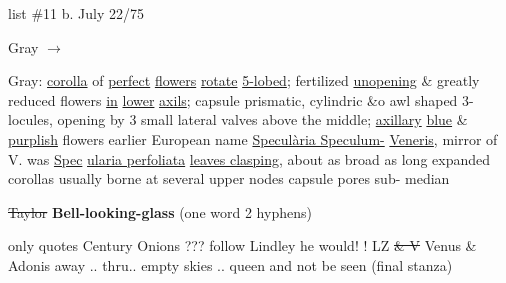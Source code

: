 \documentclass[a4paper]{article}
\begin{document}
\begin{minipage}{0.1\textwidth}
\Circled{\color{blue}{13}} 
\end{minipage}
\begin{minipage}{0.2\textwidth}
\color{blue}
\null list \#11
b. July 22/75
\end{minipage}
\begin{minipage}{0.7\textwidth}
\begin{flushright}
\color{blue}
\par
Gray
$\rightarrow$
\color{red}\Circled{\color{blue}{Venus's Looking-glass}}\par
\end{flushright}
\end{minipage}
\color{blue}
\vspace{0pt}
\begin{minipage}[t]{0.3\textwidth}
\setul{}{2pt}
Gray: \ul{corolla}
of \ul{perfect} \ul{flowers}
\ul{rotate} \ul{5-lobed};
fertilized
\ul{unopening} \&
greatly reduced
flowers \ul{in} \ul{lower}
\ul{axils}; capsule
prismatic, cylindric
\&o awl shaped 3-
locules, opening
by 3 small lateral
valves
above the
middle; \ul{axillary}
\ul{blue} \& \ul{purplish} %
flowers earlier
European name
\setul{}{1pt}
\ul{Specul\`aria Speculum-} 
\ul{Veneris}, mirror of V.
\setul{}{2pt}
was \ul{Spec}
\setul{}{1pt}
\ul{ularia perfoliata}
\setul{}{2pt}
\ul{leaves clasping}, about as
broad as long expanded
corollas usually borne
at several upper nodes
capsule pores sub-
median

\sout{Taylor}
\color{red}
\textbf{Bell-looking-glass}
(one word
2 hyphens)

only
quotes Century
Onions ???
\color{blue}
follow Lindley
he would!
! LZ
\sout{\& V}
Venus \& Adonis
away .. thru..
empty skies .. queen
and not be seen
(final stanza)
\end{minipage}
\hfill
\end{document}
